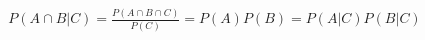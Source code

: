 \documentclass[../../probability-notes.tex]{subfiles}
\begin{document}
    \begin{align*}
        P(A \cap B | C) = \frac{P(A \cap B \cap C)}{P(C)} = P(A)P(B) = P(A|C)P(B|C) \tag*{Due to independence}
    \end{align*}
\end{document}
